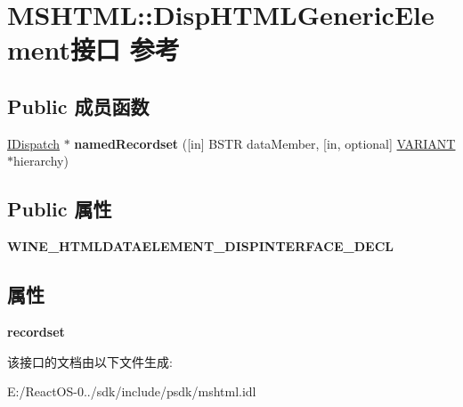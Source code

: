 \hypertarget{interface_m_s_h_t_m_l_1_1_disp_h_t_m_l_generic_element}{}\section{M\+S\+H\+T\+ML\+:\+:Disp\+H\+T\+M\+L\+Generic\+Element接口 参考}
\label{interface_m_s_h_t_m_l_1_1_disp_h_t_m_l_generic_element}
\subsection*{Public 成员函数}
\begin{DoxyCompactItemize}
\item 
\mbox{\label{interface_m_s_h_t_m_l_1_1_disp_h_t_m_l_generic_element_a6b8a853671d61f997aaa9fcfe0c3593f}} 
\hyperlink{interface_i_dispatch}{I\+Dispatch} $\ast$ {\bfseries named\+Recordset} (\mbox{[}in\mbox{]} B\+S\+TR data\+Member, \mbox{[}in, optional\mbox{]} \hyperlink{structtag_v_a_r_i_a_n_t}{V\+A\+R\+I\+A\+NT} $\ast$hierarchy)
\end{DoxyCompactItemize}
\subsection*{Public 属性}
\begin{DoxyCompactItemize}
\item 
\mbox{\label{interface_m_s_h_t_m_l_1_1_disp_h_t_m_l_generic_element_a2f00ef560e976f77a67f8bde5699367b}} 
{\bfseries W\+I\+N\+E\+\_\+\+H\+T\+M\+L\+D\+A\+T\+A\+E\+L\+E\+M\+E\+N\+T\+\_\+\+D\+I\+S\+P\+I\+N\+T\+E\+R\+F\+A\+C\+E\+\_\+\+D\+E\+CL}
\end{DoxyCompactItemize}
\subsection*{属性}
\begin{DoxyCompactItemize}
\item 
\mbox{\label{interface_m_s_h_t_m_l_1_1_disp_h_t_m_l_generic_element_a337cc634cf467d039cd4103a4a4cf1f7}} 
{\bfseries recordset}
\end{DoxyCompactItemize}


该接口的文档由以下文件生成\+:\begin{DoxyCompactItemize}
\item 
E\+:/\+React\+O\+S-\/0../sdk/include/psdk/mshtml.\+idl\end{DoxyCompactItemize}
